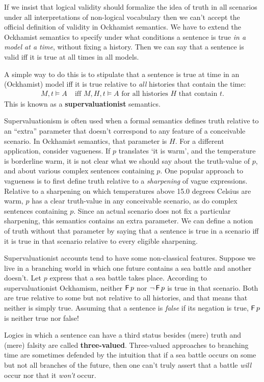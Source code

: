 If we insist that logical validity should formalize the idea of truth in all
scenarios under all interpretations of non-logical vocabulary then we can't
accept the official definition of validity in Ockhamist semantics. We have to
extend the Ockhamist semantics to specify under what conditions a sentence is
true \emph{in a model at a time}, without fixing a history. Then we can say that
a sentence is valid iff it is true at all times in all models.

A simple way to do this is to stipulate that a sentence is true at time in an
(Ockhamist) model iff it is true relative to \emph{all} histories that contain
the time:
\begin{align*}
  M,t \models A & \;\text{iff $M,H,t \models A$ for all histories $H$ that contain $t$}.
\end{align*}
This is known as a \textbf{supervaluationist} semantics.

Supervaluationism is often used when a formal semantics defines truth relative
to an ``extra'' parameter that doesn't correspond to any feature of a
conceivable scenario. In Ockhamist semantics, that parameter is $H$. For a
different application, consider vagueness. If $p$ translates `it is warm', and
the temperature is borderline warm, it is not clear what we should say about the
truth-value of $p$, and about various complex sentences containing $p$. One
popular approach to vagueness is to first define truth relative to a
\emph{sharpening} of vague expressions. Relative to a sharpening on which
temperatures above 15.0 degrees Celsius are warm, $p$ has a clear truth-value in
any conceivable scenario, as do complex sentences containing $p$. Since an
actual scenario does not fix a particular sharpening, this semantics contains an
extra parameter. We can define a notion of truth without that parameter by
saying that a sentence is true in a scenario iff it is true in that scenario
relative to every eligible sharpening.

Supervaluationist accounts tend to have some non-classical features. Suppose we
live in a branching world in which one future contains a sea battle and another
doesn't. Let $p$ express that a sea battle takes place. According to
supervaluationist Ockhamism, neither $\operatorname{\mathsf{F}} p$ nor $\neg \operatorname{\mathsf{F}} p$ is true in that
scenario. Both are true relative to some but not relative to all histories, and
that means that neither is simply true. Assuming that a sentence is \emph{false}
if its negation is true, $\operatorname{\mathsf{F}} p$ is neither true nor false!

Logics in which a sentence can have a third status besides (mere) truth and
(mere) falsity are called \textbf{three-valued}. Three-valued approaches to
branching time are sometimes defended by the intuition that if a sea battle
occurs on some but not all branches of the future, then one can't truly assert
that a battle \emph{will} occur nor that it \emph{won't} occur.

